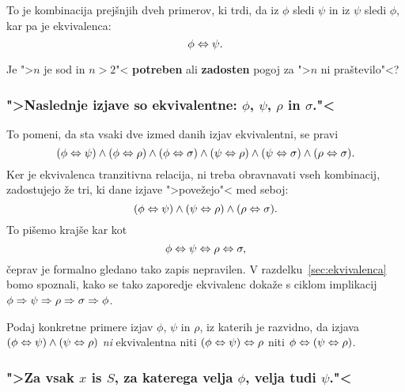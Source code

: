 To je kombinacija prejšnjih dveh primerov, ki trdi, da iz $\phi$ sledi
$\psi$ in iz $\psi$ sledi $\phi$, kar pa je ekvivalenca:
%
\begin{equation*}
  \phi \Leftrightarrow \psi.
\end{equation*}

\begin{naloga}
  Je ">$n$ je sod in $n > 2$"< \textbf{potreben} ali \textbf{zadosten}
  pogoj za ">$n$ ni praštevilo"<?
\end{naloga}


\subsubsection{">Naslednje izjave so ekvivalentne: $\phi$, $\psi$, $\rho$ in $\sigma$."<}

To pomeni, da sta vsaki dve izmed danih izjav ekvivalentni, se pravi
%
\begin{equation*}
  (\phi \Leftrightarrow \psi) \land (\phi \Leftrightarrow \rho) \land (\phi \Leftrightarrow \sigma) \land (\psi \Leftrightarrow \rho)
  \land (\psi \Leftrightarrow \sigma) \land (\rho \Leftrightarrow \sigma).
\end{equation*}
%
Ker je ekvivalenca tranzitivna relacija, ni treba obravnavati vseh
kombinacij, zadostujejo že tri, ki dane izjave ">povežejo"< med seboj:
%
\begin{equation*}
  (\phi \Leftrightarrow \psi) \land (\psi \Leftrightarrow \rho) \land (\rho \Leftrightarrow \sigma).
\end{equation*}
%
To pišemo krajše kar kot
%
\begin{equation*}
  \phi \Leftrightarrow \psi \Leftrightarrow \rho \Leftrightarrow \sigma,
\end{equation*}
%
čeprav je formalno gledano tako zapis nepravilen. V
razdelku~\ref{sec:ekvivalenca} bomo spoznali, kako se tako zaporedje
ekvivalenc dokaže s ciklom implikacij $\phi \Rightarrow \psi \Rightarrow \rho
\Rightarrow \sigma \Rightarrow \phi$.

\begin{naloga}
  Podaj konkretne primere izjav $\phi$, $\psi$ in $\rho$, iz katerih
  je razvidno, da izjava $(\phi \Leftrightarrow \psi) \land (\psi \Leftrightarrow \rho)$
  \emph{ni} ekvivalentna niti $(\phi \Leftrightarrow \psi) \Leftrightarrow \rho$ niti
  $\phi \Leftrightarrow (\psi \Leftrightarrow \rho)$.
\end{naloga}



\subsubsection{">Za vsak $x$ is $S$, za katerega velja $\phi$, velja tudi
  $\psi$."<}

